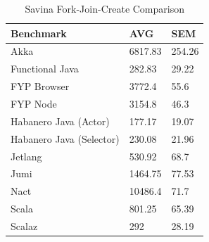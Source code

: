 \documentclass[oneside]{um-fict}
\begin{document}
\begin{table}[H]
    \begin{center}
        \begin{tabular}{|l|ll|}
        \hline
        Benchmark                & AVG & SEM \\ \hline
        Akka                     & 6817.83 & 254.26         \\
        Functional Java          & 282.83  & 29.22          \\
        FYP Browser              & 3772.4  & 55.6           \\
        FYP Node                 & 3154.8  & 46.3           \\
        Habanero Java (Actor)    & 177.17  & 19.07          \\
        Habanero Java (Selector) & 230.08  & 21.96          \\
        Jetlang                  & 530.92  & 68.7           \\
        Jumi                     & 1464.75 & 77.53          \\
        Nact                     & 10486.4 & 71.7           \\
        Scala                    & 801.25  & 65.39          \\
        Scalaz                   & 292     & 28.19          \\ \hline
        \end{tabular}
        \caption{Savina Fork-Join-Create Comparison}\label{tab:savinafjcreate}
    \end{center}
\end{table}
\end{document}
